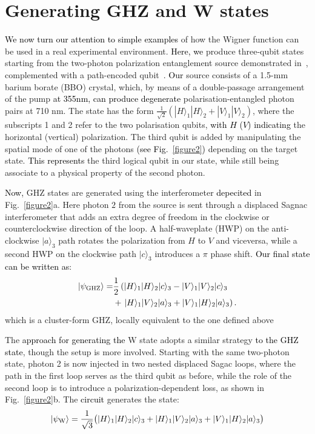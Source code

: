 \documentclass[pra,reprint,showkeys,showpacs,times,superscriptaddress]{revtex4-1}
\def\ket#1{ | #1 \rangle}
\newcommand{\red}{\textcolor{black}}
\begin{document}
\section{Generating GHZ and W states}\label{Experiment}

\red{We now turn our attention to simple examples} of how the Wigner function can be used in a real experimental environment. \red{Here, we} produce three-qubit states starting from the two-photon polarization entanglement source demonstrated in~\cite{sorgente}, complemented with a path-encoded qubit~\cite{Ciampini17}. \red{Our} source consists of a 1.5-mm barium borate (BBO) crystal, which, by means of a double-passage arrangement of the pump \red{at 355nm, can produce degenerate} polarisation-entangled photon pairs at 710 nm. The state has the form $\frac{1}{\sqrt{2}}\left(\ket{H}_1\ket{H}_2+\ket{V}_1\ket{V}_2\right)$, where the subscripts 1 and 2 refer to the two polarisation qubits, \red{with $H$ ($V$) indicating} the horizontal (vertical) polarization. The third qubit is added by manipulating the spatial mode of one of the photons \red{(see Fig.~\ref{figure2})} depending on the target state. \red{This represents} the third logical qubit in our state, while still being associate to a physical property of the second photon. 


\red{Now,} GHZ states are generated using the interferometer \red{depecited} in Fig.~\ref{figure2}a. Here photon $2$ from the source is sent through a displaced Sagnac interferometer that adds an extra degree of freedom in the clockwise or counterclockwise direction \red{of} the loop. A half-waveplate (HWP) on the anti-clockwise $\ket{a}_3$ path rotates the polarization from $H$ to $V$ and viceversa, while a second HWP on the clockwise path $\ket{c}_3$ introduces a $\pi$ phase shift. \red{Our final state can be written as}:
\begin{align}
\label{TheExpGHZState}
\ket{\psi_{\rm{GHZ}}}=&\frac{1}{2}\left(\ket{H}_1\ket{H}_2\ket{c}_3-\ket{V}_1\ket{V}_2\ket{c}_3 \right. \nonumber \\
&+ \left.\ket{H}_1\ket{V}_2\ket{a}_3+\ket{V}_1\ket{H}_2\ket{a}_3\right).
\end{align}
which is a cluster-form GHZ, locally equivalent to the one defined above

The \red{approach for generating the} W state adopts a similar strategy \red{to the GHZ state}, though the setup is more involved.  Starting with the same two-photon state, photon 2 is now injected in two nested displaced Sagac loops, where the path in the first loop serves as the third qubit as before, while the role of the second loop is to introduce a polarization-dependent loss, as shown in Fig.~\ref{figure2}b. The \red{circuit} generates the state:
\begin{multline}
\label{TheExpWState}
\ket{\psi_{\rm W}}=\frac{1}{\sqrt{3}}\big(\ket{H}_1\ket{H}_2\ket{c}_3 +\ket{H}_1\ket{V}_2\ket{a}_3+\ket{V}_1\ket{H}_2\ket{a}_3\big)
\end{multline}
\end{document}
